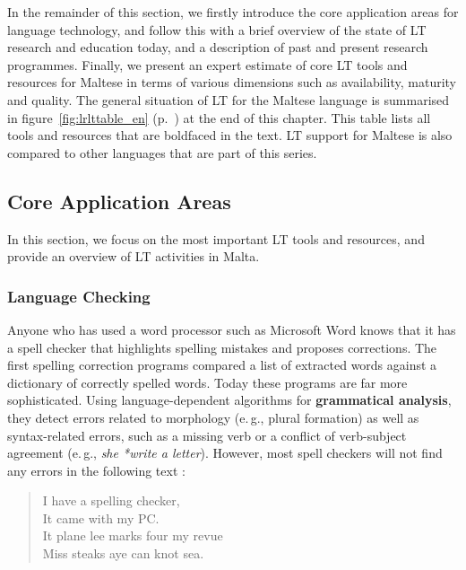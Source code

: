 \begin{multicols}{2}
In the remainder of this section, we firstly introduce the core application areas for language technology, and follow this with a brief overview of the state of LT research and education today, and a description of past and present research programmes. Finally, we present an expert estimate of core LT tools and resources for Maltese in terms of various dimensions such as availability, maturity and quality. %
The general situation of LT for the Maltese language is summarised in figure~\ref{fig:lrlttable_en} (p.~\pageref{fig:lrlttable_en}) at the end of this chapter. This table lists all tools and resources that are boldfaced in the text. LT support for Maltese is also compared to other languages that are part of this series.

\subsection{Core Application Areas}

In this section, we focus on the most important LT tools and resources, and provide an overview of LT activities in Malta. 

\subsubsection{Language Checking}

Anyone who has used a word processor such as Microsoft Word knows that it has a spell checker that highlights spelling mistakes and proposes corrections. The first spelling correction programs compared a list of extracted words against a dictionary of correctly spelled words. Today these programs are far more sophisticated. Using language-dependent algorithms for \textbf{grammatical analysis}, they detect errors related to morphology (e.\,g., plural formation) as well as syntax-related errors, such as a missing verb or a conflict of verb-subject agreement (e.\,g., \textit{she *write a letter}). However, most spell checkers will not find any errors in the following text \cite{zar1}:

\begin{quote}
  I have a spelling checker,\\
  It came with my PC.\\
  It plane lee marks four my revue\\
  Miss steaks aye can knot sea.
\end{quote}


\end{multicols}
